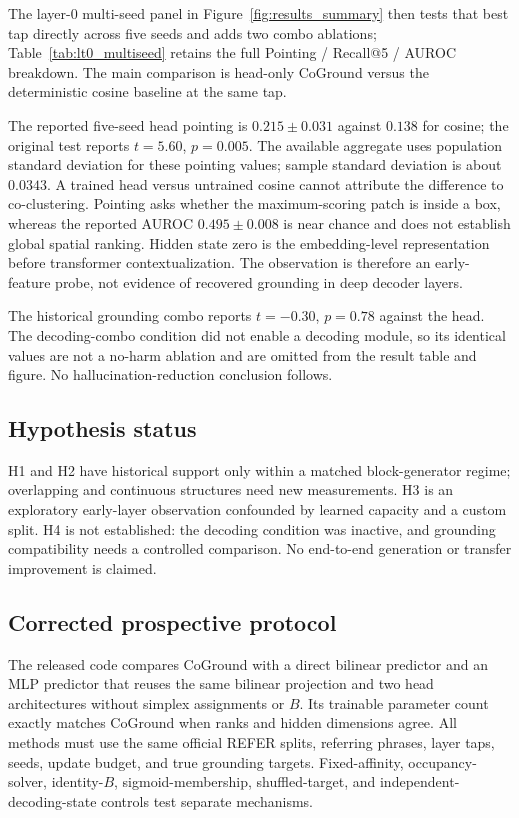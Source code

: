 \documentclass[11pt,a4paper]{article}
\begin{document}
The layer-$0$ multi-seed panel in Figure~\ref{fig:results_summary} then tests that best tap directly across five seeds and adds two combo ablations; Table~\ref{tab:lt0_multiseed} retains the full Pointing / Recall@5 / AUROC breakdown. The main comparison is head-only CoGround versus the deterministic cosine baseline at the same tap.

The reported five-seed head pointing is $0.215\pm0.031$ against $0.138$ for cosine; the original test reports $t=5.60$, $p=0.005$. The available aggregate uses population standard deviation for these pointing values; sample standard deviation is about $0.0343$. A trained head versus untrained cosine cannot attribute the difference to co-clustering. Pointing asks whether the maximum-scoring patch is inside a box, whereas the reported AUROC $0.495\pm0.008$ is near chance and does not establish global spatial ranking. Hidden state zero is the embedding-level representation before transformer contextualization. The observation is therefore an early-feature probe, not evidence of recovered grounding in deep decoder layers.

The historical grounding combo reports $t=-0.30$, $p=0.78$ against the head. The decoding-combo condition did not enable a decoding module, so its identical values are not a no-harm ablation and are omitted from the result table and figure. No hallucination-reduction conclusion follows.

\subsection{Hypothesis status}

H1 and H2 have historical support only within a matched block-generator regime; overlapping and continuous structures need new measurements. H3 is an exploratory early-layer observation confounded by learned capacity and a custom split. H4 is not established: the decoding condition was inactive, and grounding compatibility needs a controlled comparison. No end-to-end generation or transfer improvement is claimed.

\subsection{Corrected prospective protocol}
The released code compares CoGround with a direct bilinear predictor and an MLP predictor that reuses the same bilinear projection and two head architectures without simplex assignments or $B$. Its trainable parameter count exactly matches CoGround when ranks and hidden dimensions agree. All methods must use the same official REFER splits, referring phrases, layer taps, seeds, update budget, and true grounding targets. Fixed-affinity, occupancy-solver, identity-$B$, sigmoid-membership, shuffled-target, and independent-decoding-state controls test separate mechanisms.
\end{document}
